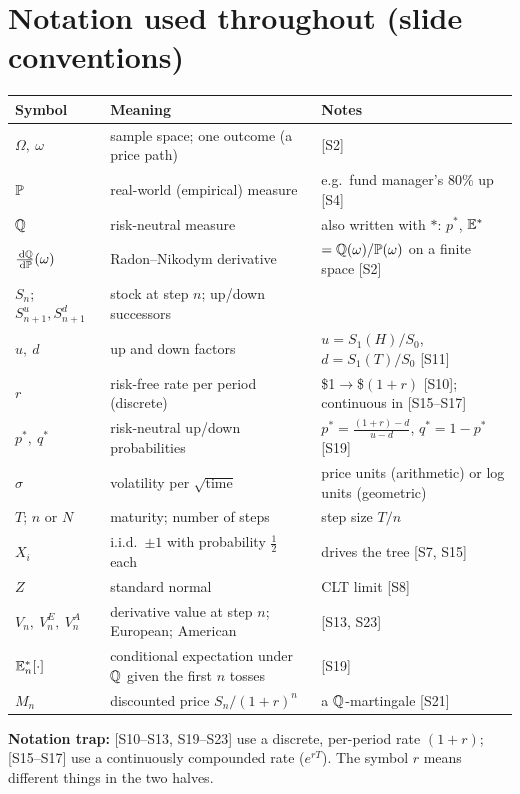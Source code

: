 \documentclass[10pt]{article}
\begin{document}
\section*{Notation used throughout (slide conventions)}
{\small\renewcommand{\arraystretch}{1.12}
\begin{tabularx}{\linewidth}{@{}l X l@{}}\toprule
Symbol & Meaning & Notes\\\midrule
$\Omega,\ \omega$ & sample space; one outcome (a price path) & [S2]\\
$\mathbb{P}$ & real-world (empirical) measure & e.g.\ fund manager's 80\% up [S4]\\
$\mathbb{Q}$ & risk-neutral measure & also written with $*$: $p^*$, $\mathbb{E}^*$\\
$\frac{\,\mathrm{d}\mathbb{Q}}{\,\mathrm{d}\mathbb{P}}(\omega)$ & Radon--Nikodym derivative & $=\mathbb{Q}(\omega)/\mathbb{P}(\omega)$ on a finite space [S2]\\
$S_n$; $S^u_{n+1},S^d_{n+1}$ & stock at step $n$; up/down successors & \\
$u,\ d$ & up and down factors & $u=S_1(H)/S_0$, $d=S_1(T)/S_0$ [S11]\\
$r$ & risk-free rate per period (discrete) & \$1$\to$\$$(1+r)$ [S10]; \flag{} continuous in [S15--S17]\\
$p^*,\ q^*$ & risk-neutral up/down probabilities & $p^*=\frac{(1+r)-d}{u-d}$, $q^*=1-p^*$ [S19]\\
$\sigma$ & volatility per $\sqrt{\text{time}}$ & price units (arithmetic) or log units (geometric)\\
$T$; $n$ or $N$ & maturity; number of steps & step size $T/n$\\
$X_i$ & i.i.d.\ $\pm1$ with probability $\frac12$ each & drives the tree [S7, S15]\\
$Z$ & standard normal & CLT limit [S8]\\
$V_n,\ V^E_n,\ V^A_n$ & derivative value at step $n$; European; American & [S13, S23]\\
$\mathbb{E}^*_n[\cdot]$ & conditional expectation under $\mathbb{Q}$ given the first $n$ tosses & [S19]\\
$M_n$ & discounted price $S_n/(1+r)^n$ & a $\mathbb{Q}$-martingale [S21]\\\bottomrule
\end{tabularx}}

\textbf{Notation trap:} [S10--S13, S19--S23] use a discrete, per-period rate $(1+r)$; [S15--S17] use a continuously compounded rate ($e^{rT}$). The symbol $r$ means different things in the two halves.
\end{document}
